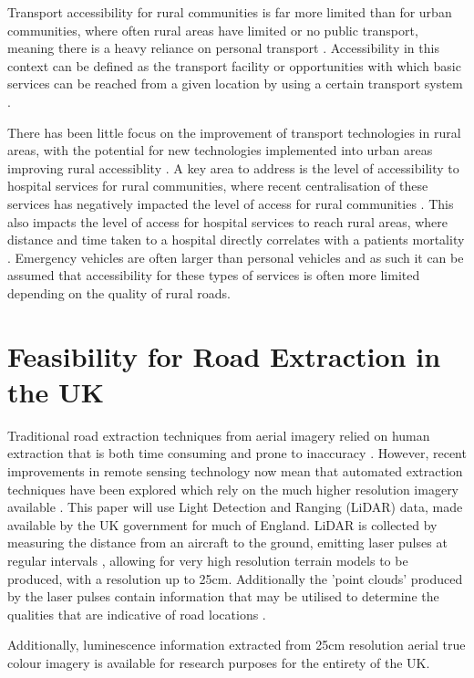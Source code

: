 \begin{multicols}{2}
Transport accessibility for rural communities is far more limited than for urban communities, where often rural areas have limited or no public transport, meaning there is a heavy reliance on personal transport \citep{gray2001}. Accessibility in this context can be defined as the transport facility or opportunities with which basic services can be reached from a given location by using a certain transport system \citep{gutierrez2009}.

There has been little focus on the improvement of transport technologies in rural areas, with the potential for new technologies implemented into urban areas improving rural accessiblity \citep{velaga2012}. A key area to address is the level of accessibility to hospital services for rural communities, where recent centralisation of these services has negatively impacted the level of access for rural communities \citep{mungall2005}. This also impacts the level of access for hospital services to reach rural areas, where distance and time taken to a hospital directly correlates with a patients mortality \citep{nicholl2007}. Emergency vehicles are often larger than personal vehicles and as such it can be assumed that accessibility for these types of services is often more limited depending on the quality of rural roads.

\section{Feasibility for Road Extraction in the UK}

Traditional road extraction techniques from aerial imagery relied on human extraction that is both time consuming and prone to inaccuracy \citep{wang2015}. However, recent improvements in remote sensing technology now mean that automated extraction techniques have been explored which rely on the much higher resolution imagery available \citep{xu2018}. This paper will use Light Detection and Ranging (LiDAR) data, made available by the UK government for much of England. LiDAR is collected by measuring the distance from an aircraft to the ground, emitting laser pulses at regular intervals \citep{environmentagency2019}, allowing for very high resolution terrain models to be produced, with a resolution up to 25cm. Additionally the 'point clouds' produced by the laser pulses contain information that may be utilised to determine the qualities that are indicative of road locations \citep[e.g.][]{clode2004}.

Additionally, luminescence information extracted from 25cm resolution aerial true colour imagery is available for research purposes for the entirety of the UK.


\end{multicols}
